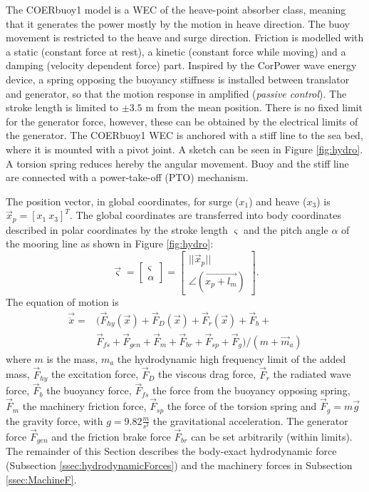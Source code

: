\documentclass[oneside,10pt,a4paper]{book}
\begin{document}
The COERbuoy1 model is a WEC of the heave-point absorber class, meaning that it generates the power mostly by the motion in heave direction. The buoy movement is restricted to the heave and surge direction. Friction is modelled with a static (constant force at rest), a kinetic (constant force while moving) and a damping (velocity dependent force) part. Inspired by the CorPower wave energy device, a spring opposing the buoyancy stiffness is installed between translator and generator, so that the motion response in amplified (\textit{passive control}). The stroke length is limited to $\pm3.5$ m from the mean position. There is no fixed limit for the generator force, however, these can be obtained by the electrical limits of the generator.
The COERbuoy1 WEC is anchored with a stiff line to the sea bed, where it is mounted with a pivot joint. A sketch can be seen in Figure \ref{fig:hydro}. A torsion spring reduces hereby the angular movement.
Buoy and the stiff line are connected with a power-take-off (PTO) mechanism.


The position vector, in global coordinates, for surge ($x_1$) and heave ($x_3$) is $\vec{x}_p=[x_1\:x_3]^T$. The global coordinates are transferred into body coordinates described in polar coordinates by the stroke length $\varsigma$ and the pitch angle $\alpha$ of the mooring line as shown in Figure \ref{fig:hydro}:
\begin{equation}
	\vec{\varsigma}=\begin{bmatrix}
		\varsigma\\ \alpha
	\end{bmatrix}
	=
	\begin{bmatrix}
		||\vec{x}_p ||\\ \angle(\vec{x_p+l_m})
	\end{bmatrix}\text{.}
\end{equation}
The equation of motion is
\begin{equation}
	\begin{split}
		\vec{\ddot{x}}=&(\vec{F}_{hy}(\vec{x})+\vec{F}_{D}(\vec{x})+\vec{F}_{r}(\vec{x})+\vec{F}_{b}+\\
		&\vec{F}_{fs}+\vec{F}_{gen}+\vec{F}_{m}+\vec{F}_{br}+\vec{F}_{sp}+\vec{F}_{g})/(m+\vec{m}_a)
	\end{split}
\end{equation}
where $m$ is the mass, $m_a$ the hydrodynamic high frequency limit of the added mass, $\vec{F}_{hy}$ the excitation force, $\vec{F}_{D}$ the viscous drag force, $\vec{F}_{r}$ the radiated wave force, $\vec{F}_{b}$ the buoyancy force, $\vec{F}_{fs}$ the force from the buoyancy opposing spring, $\vec{F}_{m}$ the machinery friction force, $\vec{F}_{sp}$ the force of the torsion spring and $\vec{F}_{g}=m \vec{g}$ the gravity force, with $g=9.82 \frac{m}{s^2}$ the gravitational acceleration. The generator force $\vec{F}_{gen}$ and the friction brake force $\vec{F}_{br}$ can be set arbitrarily (within limits).
The remainder of this Section describes the body-exact hydrodynamic force (Subsection \ref{ssec:hydrodynamicForces}) and the machinery forces in Subsection \ref{ssec:MachineF}.
\end{document}
